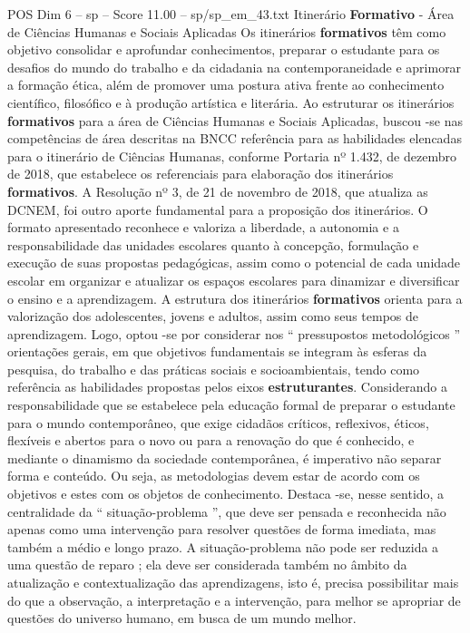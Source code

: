\begin{textsample}{POS Dim 6 – sp – Score 11.00 – sp/sp\_em\_43.txt}  \label{ex:f6_pos_082}
Itinerário \textbf{Formativo} - Área de Ciências Humanas e Sociais Aplicadas Os itinerários \textbf{formativos} têm como objetivo consolidar e aprofundar conhecimentos, preparar o estudante para os desafios do mundo do trabalho e da cidadania na contemporaneidade e aprimorar a formação ética, além de promover uma postura ativa frente ao conhecimento científico, filosófico e à produção artística e literária.
Ao estruturar os itinerários \textbf{formativos} para a área de Ciências Humanas e Sociais Aplicadas, buscou -se nas competências de área descritas na BNCC referência para as habilidades elencadas para o itinerário de Ciências Humanas, conforme Portaria nº 1.432, de dezembro de 2018, que estabelece os referenciais para elaboração dos itinerários \textbf{formativos}.
A Resolução nº 3, de 21 de novembro de 2018, que atualiza as DCNEM, foi outro aporte fundamental para a proposição dos itinerários.
O formato apresentado reconhece e valoriza a liberdade, a autonomia e a responsabilidade das unidades escolares quanto à concepção, formulação e execução de suas propostas pedagógicas, assim como o potencial de cada unidade escolar em organizar e atualizar os espaços escolares para dinamizar e diversificar o ensino e a aprendizagem.
A estrutura dos itinerários \textbf{formativos} orienta para a valorização dos adolescentes, jovens e adultos, assim como seus tempos de aprendizagem.
Logo, optou -se por considerar nos “ pressupostos metodológicos ” orientações gerais, em que objetivos fundamentais se integram às esferas da pesquisa, do trabalho e das práticas sociais e socioambientais, tendo como referência as habilidades propostas pelos eixos \textbf{estruturantes}.
Considerando a responsabilidade que se estabelece pela educação formal de preparar o estudante para o mundo contemporâneo, que exige cidadãos críticos, reflexivos, éticos, flexíveis e abertos para o novo ou para a renovação do que é conhecido, e mediante o dinamismo da sociedade contemporânea, é imperativo não separar forma e conteúdo.
Ou seja, as metodologias devem estar de acordo com os objetivos e estes com os objetos de conhecimento.
Destaca -se, nesse sentido, a centralidade da “ situação-problema ”, que deve ser pensada e reconhecida não apenas como uma intervenção para resolver questões de forma imediata, mas também a médio e longo prazo.
A situação-problema não pode ser reduzida a uma questão de reparo ; ela deve ser considerada também no âmbito da atualização e contextualização das aprendizagens, isto é, precisa possibilitar mais do que a observação, a interpretação e a intervenção, para melhor se apropriar de questões do universo humano, em busca de um mundo melhor.

\end{textsample}
